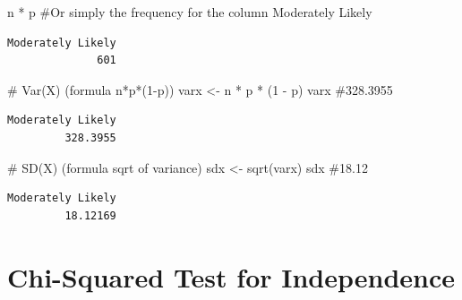 \documentclass[
  letterpaper,
  DIV=11,
  numbers=noendperiod]{scrreprt}
\newenvironment{Shaded}{\begin{snugshade}}{\end{snugshade}}
\newcommand{\CommentTok}[1]{\textcolor[rgb]{0.37,0.37,0.37}{#1}}
\newcommand{\DecValTok}[1]{\textcolor[rgb]{0.68,0.00,0.00}{#1}}
\newcommand{\FunctionTok}[1]{\textcolor[rgb]{0.28,0.35,0.67}{#1}}
\newcommand{\NormalTok}[1]{\textcolor[rgb]{0.00,0.23,0.31}{#1}}
\newcommand{\OtherTok}[1]{\textcolor[rgb]{0.00,0.23,0.31}{#1}}
\newcommand{\SpecialCharTok}[1]{\textcolor[rgb]{0.37,0.37,0.37}{#1}}
\begin{document}
\begin{Shaded}
\begin{Highlighting}[]
\NormalTok{n }\SpecialCharTok{*}\NormalTok{ p  }\CommentTok{\#Or simply the frequency for the column Moderately Likely}
\end{Highlighting}
\end{Shaded}

\begin{verbatim}
Moderately Likely 
              601 
\end{verbatim}

\begin{Shaded}
\begin{Highlighting}[]
\CommentTok{\# Var(X) (formula n*p*(1{-}p))}
\NormalTok{varx }\OtherTok{\textless{}{-}}\NormalTok{ n }\SpecialCharTok{*}\NormalTok{ p }\SpecialCharTok{*}\NormalTok{ (}\DecValTok{1} \SpecialCharTok{{-}}\NormalTok{ p)}
\NormalTok{varx  }\CommentTok{\#328.3955}
\end{Highlighting}
\end{Shaded}

\begin{verbatim}
Moderately Likely 
         328.3955 
\end{verbatim}

\begin{Shaded}
\begin{Highlighting}[]
\CommentTok{\# SD(X) (formula sqrt of variance)}
\NormalTok{sdx }\OtherTok{\textless{}{-}} \FunctionTok{sqrt}\NormalTok{(varx)}
\NormalTok{sdx  }\CommentTok{\#18.12}
\end{Highlighting}
\end{Shaded}

\begin{verbatim}
Moderately Likely 
         18.12169 
\end{verbatim}


\chapter{Chi-Squared Test for
Independence}\label{chi-squared-test-for-independence}
\end{document}

